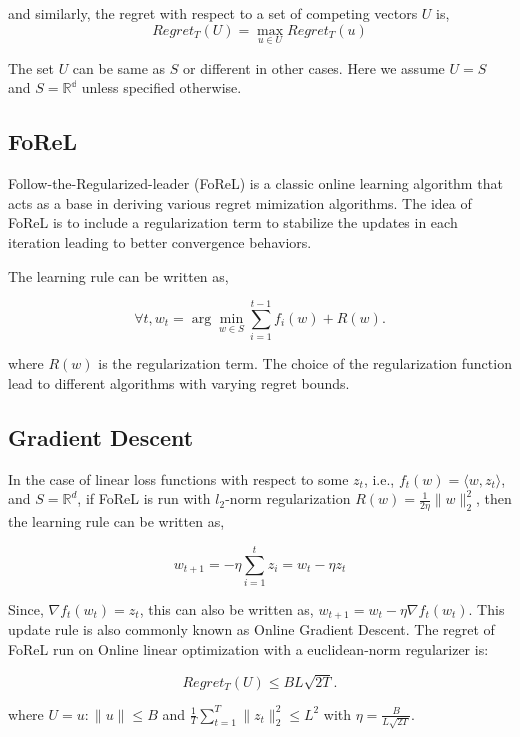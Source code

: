 and
similarly, the regret with respect to a set of competing vectors $U$ is,
\begin{equation}
	Regret_T(U) = \max_{u \in U} Regret_T(u)
\end{equation}

The set $U$ can be same
as $S$ or different in other cases.
Here we assume $U=S$ and $S=\mathbb{R^d}$ unless specified otherwise.

\subsection{FoReL}\label{sec:forel}

Follow-the-Regularized-leader (FoReL) is a classic online learning algorithm that acts as a base in
deriving various regret mimization algorithms.
The idea of FoReL is to include a regularization term to stabilize the updates in each iteration
leading to better convergence behaviors.

The learning rule can be written as,

$$\forall t, w_t = \arg \min_{w \in S}
	\sum_{i=1}^{t-1} f_i(w) + R(w).
$$

where $R(w)$ is the regularization term.
The choice of the regularization function lead to different algorithms with varying regret bounds.

\subsection{Gradient Descent}

In the case of linear loss functions with respect to some $z_t$, i.e., $f_t(w) = \langle w, z_t
	\rangle$, and $S=\mathbb{R}^d$, if FoReL is run with $l_2$-norm regularization $R(w) = \frac{1}{2
		\eta} \|w\|_2^2$, then the learning rule can be written as,

\begin{equation}
	w_{t+1} = -\eta \sum_{i=1}^t z_i = w_t - \eta z_t
\end{equation}

Since, $\nabla
	f_t(w_t) = z_t$, this can also be written as, $w_{t+1} = w_t - \eta \nabla f_t(w_t)$.
This update rule is also commonly known as Online Gradient Descent.
The regret of FoReL run on Online linear optimization with a euclidean-norm regularizer is:

$$Regret_T(U) \leq BL \sqrt {2T}.
$$

where $U = {u : \|u\| \leq B}$ and $\frac{1}{T} \sum_{t=1}^T \|z_t\|_2^2 \leq L^2$ with $\eta = \frac{B}{L\sqrt{2T}}$.

